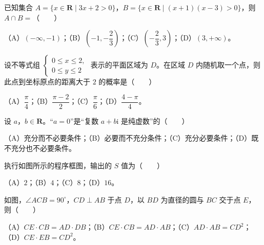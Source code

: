

\begin{question}
已知集合 $A=\{x\in\mathbf R\mid3x+2>0\}$，$B=\{x\in\mathbf R\mid(x+1)(x-3)>0\}$，则 $A\cap B=$\mbox{（　　）}

（A）$(-\infty,-1)$；（B）$\left(-1,-\dfrac23\right)$；（C）$\left(-\dfrac23,3\right)$；（D）$(3,+\infty)$。

\end{question}
\begin{question}
设不等式组 $\begin{cases}0\leqslant x\leqslant2,\\0\leqslant y\leqslant2\end{cases}$ 表示的平面区域为 $D$。在区域 $D$ 内随机取一个点，则此点到坐标原点的距离大于 $2$ 的概率是\mbox{（　　）}

（A）$\dfrac\pi4$；（B）$\dfrac{\pi-2}2$；（C）$\dfrac\pi6$；（D）$\dfrac{4-\pi}4$。

\end{question}
\begin{question}
设 $a$，$b\in\mathbf R$。“$a=0$”是“复数 $a+b\mathrm i$ 是纯虚数”的\mbox{（　　）}

（A）充分而不必要条件；（B）必要而不充分条件；（C）充分必要条件；（D）既不充分也不必要条件。

\Needspace{0.4\textheight}
\end{question}
\begin{question}
执行如图所示的程序框图，输出的 $S$ 值为\mbox{（　　）}
\nopagebreak[4]
\begin{center}\end{center}
\nopagebreak[4]
（A）$2$；（B）$4$；（C）$8$；（D）$16$。

\Needspace{0.4\textheight}
\end{question}
\begin{question}
如图，$\angle ACB=90^\circ$，$CD\perp AB$ 于点 $D$，以 $BD$ 为直径的圆与 $BC$ 交于点 $E$，则\mbox{（　　）}
\nopagebreak[4]
\begin{center}\end{center}
\nopagebreak[4]
（A）$CE\cdot CB=AD\cdot DB$；（B）$CE\cdot CB=AD\cdot AB$；（C）$AD\cdot AB=CD^2$；（D）$CE\cdot EB=CD^2$。

\end{question}
